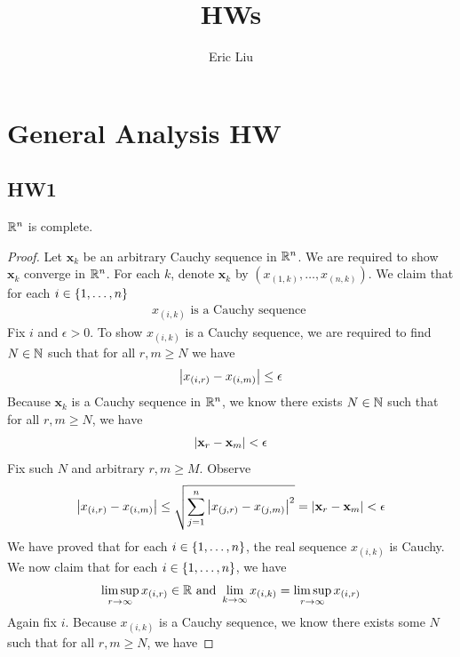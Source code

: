 \documentclass{report}
\title{\Huge{HWs}}
\author{\huge{Eric Liu}}
\date{}
\begin{document}
\maketitle
\newpage%
\tableofcontents
\pagebreak

\chapter{General Analysis HW}
\section{HW1}
\begin{theorem}
$\mathbb{R}^n$ is complete.
\end{theorem}
\begin{proof}
Let $\textbf{x}_k$ be an arbitrary Cauchy sequence in $\mathbb{R}^n$. We are required to show  $\textbf{x}_k$ converge in $\mathbb{R}^n$. For each $k$, denote  $\textbf{x}_k$ by $(x_{(1,k)},\dots ,x_{(n,k)})$. We claim that for each $i \in \{ 1,\dots ,n \}$
\begin{align*}
x_{(i,k)}\text{ is a Cauchy sequence }
\end{align*}
Fix $i$ and $\epsilon >0$. To show $x_{(i,k)}$ is a Cauchy sequence, we are required to find $N\in\mathbb{N}$ such that for all $r,m\geq N$ we have 
\begin{align*}
\left|x_{(i,r)}-x_{(i,m)}\right|\leq \epsilon 
\end{align*}
Because $\textbf{x}_k$ is a Cauchy sequence in $\mathbb{R}^n$, we know there exists  $N\in\mathbb{N}$ such that for all $r,m\geq N$, we have 
\begin{align*}
\left|\textbf{x}_r-\textbf{x}_m\right|< \epsilon 
\end{align*}
Fix such $N$ and arbitrary $r,m\geq M$. Observe 
\begin{align*}
\left|x_{(i,r)}-x_{(i,m)}\right|\leq \sqrt{\sum_{j=1}^n \left|x_{(j,r)}-x_{(j,m)}\right|^2}= \left|\textbf{x}_r - \textbf{x}_m\right|< \epsilon 
\end{align*}
We have proved that for each $i\in \{ 1,\dots ,n \}$, the real sequence $x_{(i,k)}$ is Cauchy. We now claim that for each $i \in \{ 1,\dots, n \}$, we have 
\begin{align*}
  \limsup_{r\to\infty} x_{(i,r)}\in\mathbb{R} \text{ and }\lim_{k\to \infty}x_{(i,k)}= \limsup_{r\to\infty} x_{(i,r)}
\end{align*}
Again fix $i$. Because $x_{(i,k)}$ is a Cauchy sequence, we know there exists some $N$ such that for all $r,m\geq N$, we have 

\end{proof}
\end{document}
